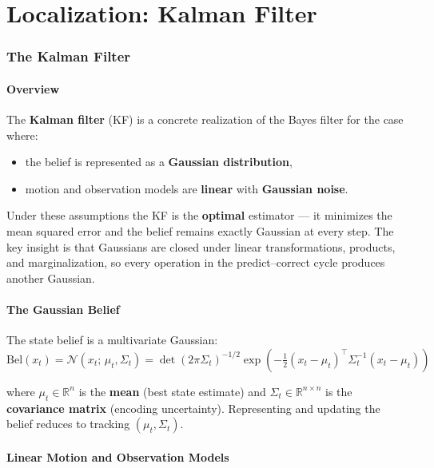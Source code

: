 \documentclass[11pt,a4paper]{article}
\theoremstyle{definition}
\theoremstyle{plain}
\theoremstyle{remark}
\begin{document}
\part{Localization: Kalman Filter}

\section{The Kalman Filter}

\subsection{Overview}

The \textbf{Kalman filter} (KF) is a concrete realization of the Bayes filter for the case where:
\begin{itemize}
    \item the belief is represented as a \textbf{Gaussian distribution},
    \item motion and observation models are \textbf{linear} with \textbf{Gaussian noise}.
\end{itemize}

Under these assumptions the KF is the \textbf{optimal} estimator — it minimizes the mean squared error and the belief remains exactly Gaussian at every step. The key insight is that Gaussians are closed under linear transformations, products, and marginalization, so every operation in the predict--correct cycle produces another Gaussian.

\subsection{The Gaussian Belief}

The state belief is a multivariate Gaussian:
\[
\mathrm{Bel}(x_t) = \mathcal{N}(x_t;\, \mu_t, \Sigma_t) = \det(2\pi\Sigma_t)^{-1/2} \exp\!\left(-\tfrac{1}{2}(x_t - \mu_t)^\top \Sigma_t^{-1}(x_t - \mu_t)\right)
\]

where $\mu_t \in \mathbb{R}^n$ is the \textbf{mean} (best state estimate) and $\Sigma_t \in \mathbb{R}^{n \times n}$ is the \textbf{covariance matrix} (encoding uncertainty). Representing and updating the belief reduces to tracking $(\mu_t, \Sigma_t)$.

\subsection{Linear Motion and Observation Models}
\end{document}
